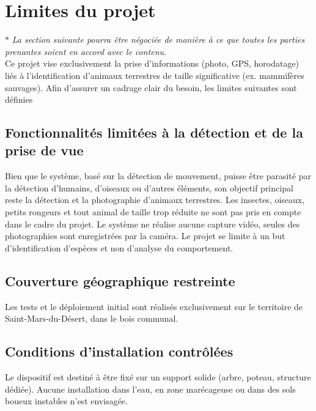 \section{Limites du projet}

$ \ast $ \textit{La section suivante pourra être négociée de manière à ce que toutes les parties prenantes soient en accord avec le contenu.} \\

Ce projet vise exclusivement la prise d’informations (photo, GPS, horodatage) liés à l’identification d’animaux terrestres de taille significative (ex. mammifères sauvages). Afin d’assurer un cadrage clair du besoin, les limites suivantes sont définies

\subsection{Fonctionnalités limitées à la détection et de la prise de vue}
Bien que le système, basé sur la détection de mouvement, puisse être parasité par la détection d’humains, d’oiseaux ou d’autres éléments, son objectif principal reste la détection et la photographie d’animaux terrestres. Les insectes, oiseaux, petits rongeurs et tout animal de taille trop réduite ne sont pas pris en compte dans le cadre du projet. Le système ne réalise aucune capture vidéo, seules des photographies sont enregistrées par la caméra. Le projet se limite à un but d’identification d'espèces et non d’analyse du comportement.

\subsection{Couverture géographique restreinte}
Les tests et le déploiement initial sont réalisés exclusivement sur le territoire de Saint-Mars-du-Désert, dans le bois communal.

\subsection{Conditions d’installation contrôlées}
Le dispositif est destiné à être fixé sur un support solide (arbre, poteau, structure dédiée). Aucune installation dans l’eau, en zone marécageuse ou dans des sols boueux instables n’est envisagée.